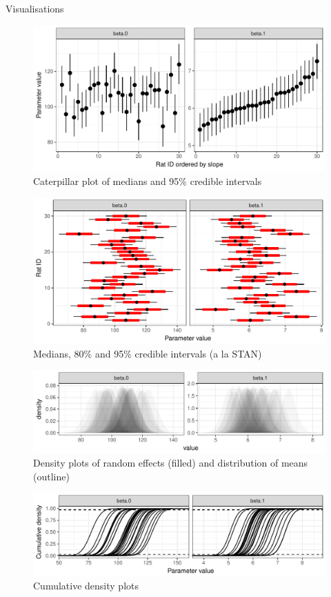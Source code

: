 {\begin{columns}
\begin{column}[t]{0.45\linewidth}
\begin{block}{Visualisations}
	\setlength{\parskip}{15pt}


\begin{figure}
	\includegraphics[width=0.8\linewidth]{raterpillar}
	\caption{Caterpillar plot of medians and 95\% credible intervals}
\end{figure}

\begin{figure}
	\includegraphics[width=0.8\linewidth]{stan}
	\caption{Medians, 80\% and 95\% credible intervals (a la STAN)}
\end{figure}

\begin{figure}
	\includegraphics[width=0.8\linewidth]{ghost}
	\caption{Density plots of random effects (filled) and distribution of means (outline)}
\end{figure}

\begin{figure}
	\includegraphics[width=0.8\linewidth]{aitkin}
	\caption{Cumulative density plots}
\end{figure}



\end{block}
\end{column}
\end{columns}}
